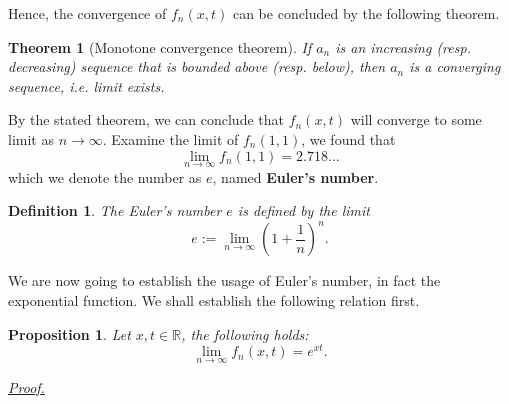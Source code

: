 \documentclass[12pt]{article}
\newtheorem{definition}{Definition}[section]
\newtheorem*{theorem}{Theorem}
\newtheorem*{proposition}{Proposition}
\renewenvironment{proof}[1][Proof]{\begin{snugshade*} \underline{\textit{{#1}.}}\\}{\hfill \qedsymbol \end{snugshade*}}
\begin{document}
    Hence, the convergence of $f_n(x,t)$ can be concluded by the following theorem.

    \begin{theorem}[Monotone convergence theorem]
        If $a_n$ is an increasing (resp. decreasing) sequence that is bounded above (resp. below), then $a_n$ is a converging sequence, i.e. limit exists.
    \end{theorem}

    By the stated theorem, we can conclude that $f_n(x,t)$ will converge to some limit as $n\to \infty$. Examine the limit of $f_n(1,1)$, we found that \[\lim_{n\to \infty}f_n(1,1) = 2.718\dots\] which we denote the number as $e$, named \textbf{Euler's number}.

    \begin{definition}
        The Euler's number $e$ is defined by the limit \[e:=\lim_{n\to \infty}(1+\frac{1}{n})^n.\]
    \end{definition}

    We are now going to establish the usage of Euler's number, in fact the exponential function. We shall establish the following relation first.

    \begin{proposition}
        Let $x,t\in\mathbb{R}$, the following holds: \[\lim_{n\to \infty}f_n(x,t)=e^{xt}.\]
    \end{proposition}

    \begin{proof}
        
    \end{proof}
\end{document}
